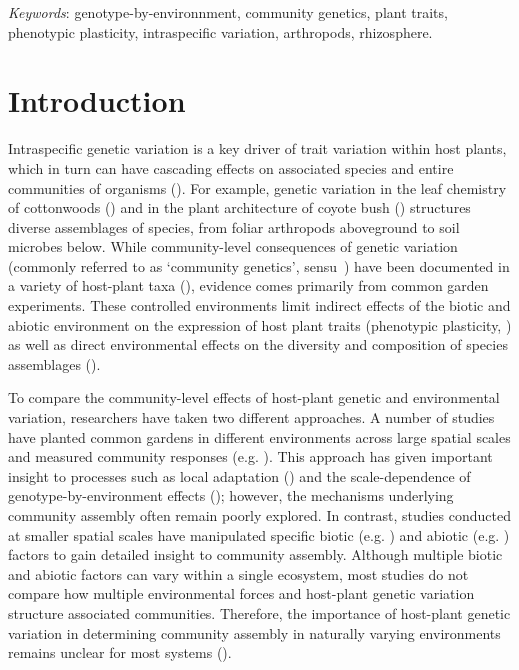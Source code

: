 \documentclass[11pt]{article}
\begin{document}
\textit{Keywords}: genotype-by-environnment, community genetics, plant traits, phenotypic plasticity, intraspecific variation, arthropods, rhizosphere. 

\newpage{}

\section*{Introduction}

Intraspecific genetic variation is a key driver of trait variation
within host plants, which in turn can have cascading effects on
associated species and entire communities of organisms
(\citealt{Fritz_1988, Lamit_2016, Maddox_1990, antonovics1992toward}). For
example, genetic variation in the leaf chemistry of cottonwoods
(\citealt{Whitham_2006}) and in the plant architecture of coyote bush
(\citealt{Crutsinger_2014}) structures diverse assemblages of species, from foliar
arthropods aboveground to soil microbes below. While community-level
consequences of genetic variation (commonly referred to as `community
genetics', sensu~\citealt{antonovics1992toward}) have been documented in a variety of
host-plant taxa (\citealt{Whitham_2012}), evidence comes primarily from common
garden experiments. These
controlled environments limit indirect effects of the biotic and abiotic
environment on the expression of host plant traits (phenotypic plasticity, \citealt{Gratani_2014}) as
well as direct environmental effects on the diversity and composition of species assemblages
(\citealt{macarthur1972geographical, Gaston_2000}). 

To compare the community-level effects of host-plant genetic and environmental variation, researchers have taken two different approaches. A number of studies have planted common gardens in different environments across large spatial scales and measured community responses (e.g. \citealt{wagner2016host,busby2014differentiating,tack2010spatial,Johnson_2005}). This approach has given important insight to processes such as local adaptation (\citealt{busby2014differentiating,tack2010overrun}) and the scale-dependence of genotype-by-environment effects (\citealt{Johnson_2005,tack2010spatial}); however, the mechanisms underlying community assembly often remain poorly explored. In contrast, studies conducted at smaller spatial scales have manipulated specific biotic (e.g. \citealt{Agrawal_2003, Abdala_Roberts_2012,Johnson_2008,Mooney_2008}) and abiotic (e.g. \citealt{Orians_1996, Barrios2016,Rossi_1998, Abdala_Roberts_2012a}) factors to gain detailed insight to community assembly. Although multiple biotic and abiotic factors can vary within a single ecosystem, most studies do not compare how multiple environmental forces and host-plant genetic variation structure associated communities. Therefore, the importance of host-plant genetic variation in determining community assembly in naturally varying environments remains unclear for most systems (\citealt{Hersch_Green_2011, Tack_2011, Crutsinger_2015}).
\end{document}
